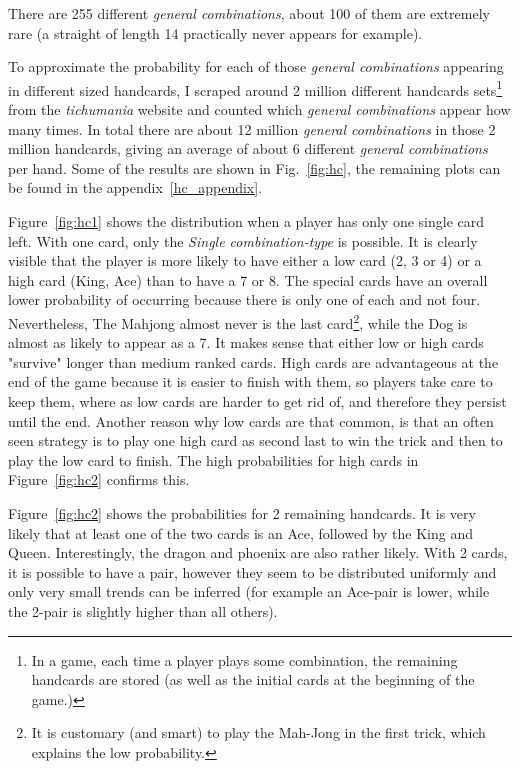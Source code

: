 There are 255 different \textit{general combinations}, about 100 of them are extremely rare (a straight of length 14 practically never appears for example).

To approximate the probability for each of those \textit{general combinations} appearing in different sized handcards, I scraped around 2 million different handcards sets\footnote{In a game, each time a player plays some combination, the remaining handcards are stored (as well as the initial cards at the beginning of the game.)} from the \textit{tichumania} website and counted which \textit{general combinations} appear how many times. In total there are about 12 million \textit{general combinations} in those 2 million handcards, giving an average of about 6 different \textit{general combinations} per hand.
Some of the results are shown in Fig.~\ref{fig:hc}, the remaining plots can be found in the appendix~\ref{hc_appendix}.

Figure~\ref{fig:hc1} shows the distribution  when a player has only one single card left. With one card, only the \textit{Single combination-type} is possible.\newline
It is clearly visible that the player is more likely to have either a low card (2, 3 or 4) or a high card (King, Ace) than to have a 7 or 8.
The special cards have an overall lower probability of occurring because there is only one of each and not four. Nevertheless, The Mahjong almost never is the last card\footnote{It is customary (and smart) to play the Mah-Jong in the first trick, which explains the low probability.}, while the Dog is almost as likely to appear as a 7.
It makes sense that either low or high cards "survive" longer than medium ranked cards. High cards are advantageous at the end of the game because it is easier to finish with them, so players take care to keep them, where as low cards are harder to get rid of, and therefore they persist until the end. Another reason why low cards are that common, is that an often seen strategy is to play one high card as second last to win the trick and then to play the low card to finish. The high probabilities for high cards in Figure~\ref{fig:hc2} confirms this.

Figure~\ref{fig:hc2} shows the probabilities for 2 remaining handcards. It is very likely that at least one of the two cards is an Ace, followed by the King and Queen. Interestingly, the dragon and phoenix are also rather likely.
With 2 cards, it is possible to have a pair, however they seem to be distributed uniformly and only very small trends can be inferred (for example an Ace-pair is lower, while the 2-pair is slightly higher than all others).

